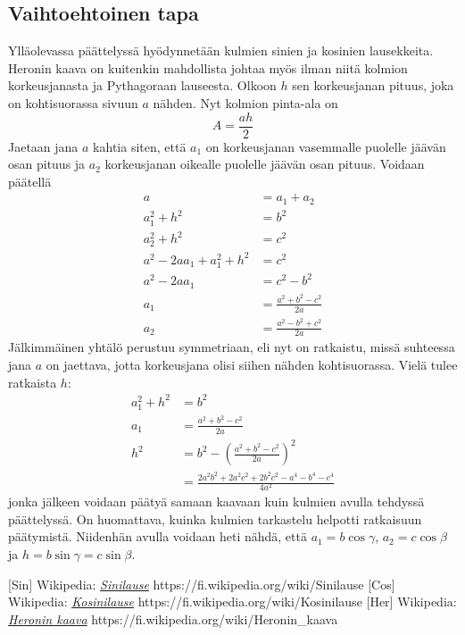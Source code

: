\documentclass[a4paper,12pt]{amsart}
\begin{document}
\subsection{Vaihtoehtoinen tapa}
Ylläolevassa päättelyssä hyödynnetään kulmien sinien ja kosinien lausekkeita. Heronin kaava on kuitenkin mahdollista johtaa myös ilman niitä kolmion korkeusjanasta ja Pythagoraan lauseesta. Olkoon $h$ sen korkeusjanan pituus, joka on kohtisuorassa sivuun $a$ nähden. Nyt kolmion pinta-ala on
\begin{equation}
A=\frac{ah}{2}
\end{equation}
Jaetaan jana $a$ kahtia siten, että $a_1$ on korkeusjanan vasemmalle puolelle jäävän osan pituus ja $a_2$ korkeusjanan oikealle puolelle jäävän osan pituus. Voidaan päätellä
\begin{equation}
\begin{split}
a &= a_1+a_2 \\
a_1^2+h^2 &= b^2 \\
a_2^2+h^2 &= c^2 \\
a^2-2aa_1+a_1^2+h^2 &= c^2 \\
a^2-2aa_1 &= c^2-b^2 \\
a_1 &= \frac{a^2+b^2-c^2}{2a} \\
a_2 &= \frac{a^2-b^2+c^2}{2a}
\end{split}
\end{equation}
Jälkimmäinen yhtälö perustuu symmetriaan, eli nyt on ratkaistu, missä suhteessa jana $a$ on jaettava, jotta korkeusjana olisi siihen nähden kohtisuorassa. Vielä tulee ratkaista $h$:
\begin{equation}
\begin{split}
a_1^2+h^2 &= b^2 \\
a_1 &= \frac{a^2+b^2-c^2}{2a} \\
h^2 &= b^2-\left(\frac{a^2+b^2-c^2}{2a}\right)^2 \\
&= \frac{2a^2 b^2+2a^2 c^2+2b^2 c^2-a^4-b^4-c^4}{4a^2}
\end{split}
\end{equation}
jonka jälkeen voidaan päätyä samaan kaavaan kuin kulmien avulla tehdyssä päättelyssä. On huomattava, kuinka kulmien tarkastelu helpotti ratkaisuun päätymistä. Niidenhän avulla voidaan heti nähdä, että $a_1=b\cos\gamma$, $a_2=c\cos\beta$ ja $h=b\sin\gamma=c\sin\beta$.
\begin{thebibliography}{99}
[Sin] Wikipedia: \href{https://fi.wikipedia.org/wiki/Sinilause}{\emph{Sinilause}} https://fi.wikipedia.org/wiki/Sinilause
[Cos] Wikipedia: \href{https://fi.wikipedia.org/wiki/Kosinilause}{\emph{Kosinilause}} https://fi.wikipedia.org/wiki/Kosinilause
[Her] Wikipedia: \href{https://fi.wikipedia.org/wiki/Heronin_kaava}{\emph{Heronin kaava}} https://fi.wikipedia.org/wiki/Heronin\_kaava
\end{thebibliography}
\end{document}

